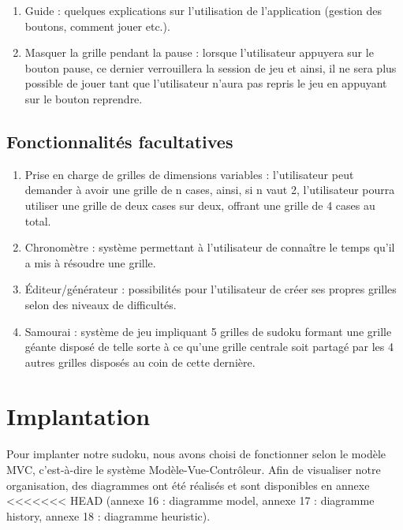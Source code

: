 \begin{enumerate}
  \item Guide : quelques explications sur l'utilisation de l'application 
  (gestion des boutons, comment jouer etc.).\\
 
  \item Masquer la grille pendant la pause : lorsque l'utilisateur appuyera sur le bouton pause, 
  ce dernier verrouillera la session de jeu et ainsi, 
  il ne sera plus possible de jouer tant que l'utilisateur 
  n'aura pas repris le jeu en appuyant sur le bouton reprendre. \\
\end{enumerate}
 
\subsection{Fonctionnalités facultatives}

\begin{enumerate}
  \item Prise en charge de grilles de dimensions variables : 
  l'utilisateur peut demander à avoir une grille de n cases, ainsi,
  si n vaut 2, l'utilisateur pourra utiliser une grille de deux cases sur deux, 
  offrant une grille de 4 cases au total.   \\

 \item Chronomètre : système permettant à l'utilisateur de connaître 
 le temps qu'il a mis à résoudre une grille.  \\
 
 \item Éditeur/générateur : possibilités pour l'utilisateur 
 de créer ses propres grilles selon des niveaux de difficultés. \\
 
 \item Samourai : système de jeu impliquant 5 grilles de sudoku formant une grille géante 
 disposé de telle sorte à ce qu'une grille centrale soit partagé 
 par les 4 autres grilles disposés au coin de cette dernière.  \\
\end{enumerate}

\section{Implantation}
Pour implanter notre sudoku, nous avons choisi de fonctionner selon le modèle MVC, 
c'est-à-dire le système Modèle-Vue-Contrôleur. Afin de visualiser notre organisation, 
des diagrammes ont été réalisés et sont disponibles en annexe 
<<<<<<< HEAD
(annexe 16 : diagramme model,
annexe 17 : diagramme history,
annexe 18 : diagramme heuristic).

